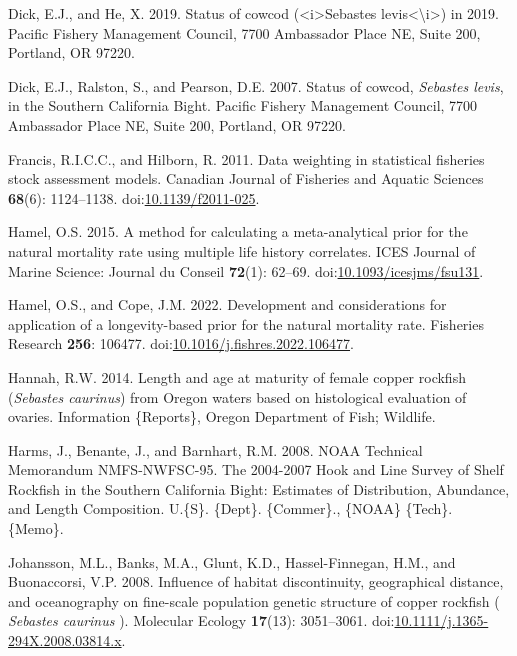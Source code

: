 \documentclass[11pt,
  english,
  letterpaper,
]{article}
\newlength{\cslhangindent}
\newenvironment{CSLReferences}[2] %
 {%
  \setlength{\parindent}{0pt}
  \ifodd #1 \everypar{\setlength{\hangindent}{\cslhangindent}}\ignorespaces\fi
  \ifnum #2 > 0
  \setlength{\parskip}{#2\baselineskip}
  \fi
 }%
 {}
\begin{document}
\begin{CSLReferences}{1}{0}
\leavevmode{}%
Dick, E.J., and He, X. 2019. Status of cowcod ({\textless{}}i{\textgreater{}}{Sebastes} levis{\textless{}}{\textbackslash{}}i{\textgreater{}}) in 2019. Pacific Fishery Management Council, 7700 Ambassador Place NE, Suite 200, Portland, OR 97220.

\leavevmode{}%
Dick, E.J., Ralston, S., and Pearson, D.E. 2007. Status of cowcod, \emph{{Sebastes} levis}, in the {Southern} {California} {Bight}. Pacific Fishery Management Council, 7700 Ambassador Place NE, Suite 200, Portland, OR 97220.

\leavevmode{}%
Francis, R.I.C.C., and Hilborn, R. 2011. Data weighting in statistical fisheries stock assessment models. Canadian Journal of Fisheries and Aquatic Sciences \textbf{68}(6): 1124--1138. doi:\href{https://doi.org/10.1139/f2011-025}{10.1139/f2011-025}.

\leavevmode{}%
Hamel, O.S. 2015. A method for calculating a meta-analytical prior for the natural mortality rate using multiple life history correlates. ICES Journal of Marine Science: Journal du Conseil \textbf{72}(1): 62--69. doi:\href{https://doi.org/10.1093/icesjms/fsu131}{10.1093/icesjms/fsu131}.

\leavevmode{}%
Hamel, O.S., and Cope, J.M. 2022. Development and considerations for application of a longevity-based prior for the natural mortality rate. Fisheries Research \textbf{256}: 106477. doi:\href{https://doi.org/10.1016/j.fishres.2022.106477}{10.1016/j.fishres.2022.106477}.

\leavevmode{}%
Hannah, R.W. 2014. Length and age at maturity of female copper rockfish (\emph{{Sebastes} caurinus}) from {Oregon} waters based on histological evaluation of ovaries. Information \{Reports\}, Oregon Department of Fish; Wildlife.

\leavevmode{}%
Harms, J., Benante, J., and Barnhart, R.M. 2008. {NOAA} {Technical} {Memorandum} {NMFS}-{NWFSC}-95. {The} 2004-2007 {Hook} and {Line} {Survey} of {Shelf} {Rockfish} in the {Southern} {California} {Bight}: {Estimates} of {Distribution}, {Abundance}, and {Length} {Composition}. U.\{S\}. \{Dept\}. \{Commer\}., \{NOAA\} \{Tech\}. \{Memo\}.

\leavevmode{}%
Johansson, M.L., Banks, M.A., Glunt, K.D., Hassel-Finnegan, H.M., and Buonaccorsi, V.P. 2008. Influence of habitat discontinuity, geographical distance, and oceanography on fine-scale population genetic structure of copper rockfish ( \emph{{Sebastes} caurinus} ). Molecular Ecology \textbf{17}(13): 3051--3061. doi:\href{https://doi.org/10.1111/j.1365-294X.2008.03814.x}{10.1111/j.1365-294X.2008.03814.x}.


\end{CSLReferences}
\end{document}
